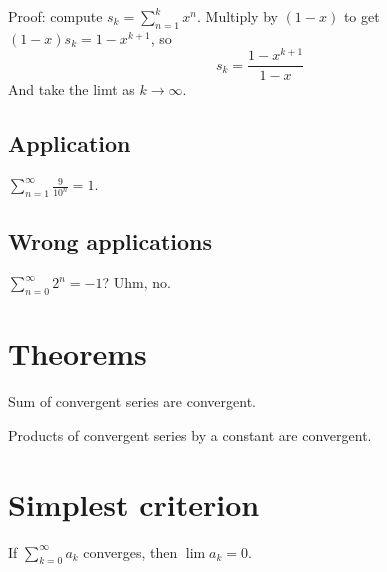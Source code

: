 \documentclass[12pt]{article}
\begin{document}
Proof: compute $s_k = \sum_{n=1}^k x^n$.  Multiply by $(1-x)$ to get $(1-x) s_k = 1 - x^{k+1}$, so
$$
s_k = \frac{1-x^{k+1}}{1-x}
$$
And take the limt as $k \to \infty$.

\subsection*{Application}

$\sum_{n=1}^\infty \frac{9}{10^n} = 1$.

\subsection*{Wrong applications}

$\sum_{n=0}^\infty 2^n = -1$?  Uhm, no.

\section*{Theorems}

Sum of convergent series are convergent.

Products of convergent series by a constant are convergent.

\section*{Simplest criterion}

If $\sum_{k=0}^\infty a_k$ converges, then $\lim a_k = 0$.
\end{document}
